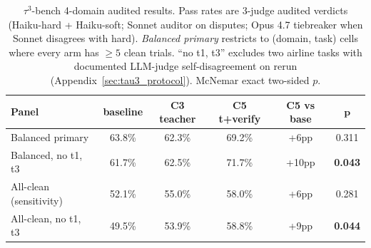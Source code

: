 \begin{table}[!ht]
\centering
\small
\caption{$\tau^3$-bench 4-domain audited results. Pass rates are 3-judge audited verdicts (Haiku-hard + Haiku-soft; Sonnet auditor on disputes; Opus 4.7 tiebreaker when Sonnet disagrees with hard). \emph{Balanced primary} restricts to (domain, task) cells where every arm has $\geq 5$ clean trials. ``no t1, t3'' excludes two airline tasks with documented LLM-judge self-disagreement on rerun (Appendix~\ref{sec:tau3_protocol}). McNemar exact two-sided $p$.}
\label{tab:tau3_results}
\begin{tabular}{lccccc}
\toprule
\textbf{Panel} & \textbf{baseline} & \textbf{C3 teacher} & \textbf{C5 t+verify} & \textbf{C5 vs base} & $\bm{p}$ \\
\midrule
Balanced primary           & 63.8\% & 62.3\% & 69.2\% & +6pp & 0.311 \\
Balanced, no t1, t3        & 61.7\% & 62.5\% & 71.7\% & +10pp & \textbf{0.043} \\
\addlinespace
All-clean (sensitivity)    & 52.1\% & 55.0\% & 58.0\% & +6pp & 0.281 \\
All-clean, no t1, t3       & 49.5\% & 53.9\% & 58.8\% & +9pp & \textbf{0.044} \\
\bottomrule
\end{tabular}
\end{table}

